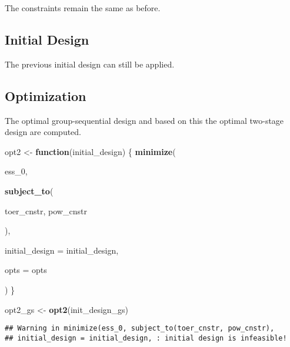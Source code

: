 \documentclass[]{book}
\newenvironment{Shaded}{\begin{snugshade}}{\end{snugshade}}
\newcommand{\ControlFlowTok}[1]{\textcolor[rgb]{0.13,0.29,0.53}{\textbf{#1}}}
\newcommand{\DataTypeTok}[1]{\textcolor[rgb]{0.13,0.29,0.53}{#1}}
\newcommand{\DecValTok}[1]{\textcolor[rgb]{0.00,0.00,0.81}{#1}}
\newcommand{\KeywordTok}[1]{\textcolor[rgb]{0.13,0.29,0.53}{\textbf{#1}}}
\newcommand{\NormalTok}[1]{#1}
\newcommand{\OperatorTok}[1]{\textcolor[rgb]{0.81,0.36,0.00}{\textbf{#1}}}
\newcommand{\StringTok}[1]{\textcolor[rgb]{0.31,0.60,0.02}{#1}}
\begin{document}
The constraints remain the same as before.

\hypertarget{initial-design-4}{%
\subsection{Initial Design}\label{initial-design-4}}

The previous initial design can still be applied.

\hypertarget{optimization-4}{%
\subsection{Optimization}\label{optimization-4}}

The optimal group-sequential design and based on this the
optimal two-stage design are computed.

\begin{Shaded}
\begin{Highlighting}[]
\NormalTok{opt2 <-}\StringTok{ }\ControlFlowTok{function}\NormalTok{(initial_design) \{}
    \KeywordTok{minimize}\NormalTok{(}
        
\NormalTok{        ess_}\DecValTok{0}\NormalTok{,}
        
        \KeywordTok{subject_to}\NormalTok{(}
            
\NormalTok{            toer_cnstr,}
\NormalTok{            pow_cnstr}
            
\NormalTok{        ),}
        
        \DataTypeTok{initial_design =}\NormalTok{ initial_design,}
        
        \DataTypeTok{opts =}\NormalTok{ opts}
        
\NormalTok{)}
\NormalTok{\}}

\NormalTok{opt2_gs <-}\StringTok{ }\KeywordTok{opt2}\NormalTok{(init_design_gs)}
\end{Highlighting}
\end{Shaded}

\begin{verbatim}
## Warning in minimize(ess_0, subject_to(toer_cnstr, pow_cnstr),
## initial_design = initial_design, : initial design is infeasible!
\end{verbatim}

\begin{Shaded}
\end{Shaded}
\end{document}
